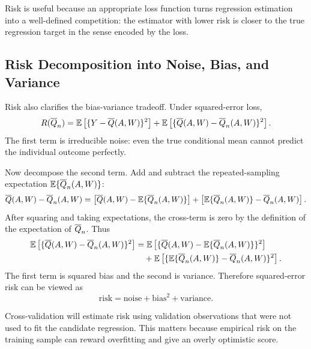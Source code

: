 \begin{keyidea}
Risk is useful because an appropriate loss function turns regression estimation into a
well-defined competition: the estimator with lower risk is closer to the true
regression target in the sense encoded by the loss.
\end{keyidea}

\subsection{Risk Decomposition into Noise, Bias, and Variance}

Risk also clarifies the bias-variance tradeoff. Under squared-error loss,
\[
R(\overline{Q}_n)
=
\mathbb{E}\left[
\{Y-\overline{Q}(A,W)\}^2
\right]
+
\mathbb{E}\left[
\{\overline{Q}(A,W)-\overline{Q}_n(A,W)\}^2
\right].
\]
The first term is irreducible noise: even the true conditional mean cannot predict the
individual outcome perfectly.

Now decompose the second term. Add and subtract the repeated-sampling expectation
$\mathbb{E}\{\overline{Q}_n(A,W)\}$:
\[
\overline{Q}(A,W)-\overline{Q}_n(A,W)
=
\left[\overline{Q}(A,W)-\mathbb{E}\{\overline{Q}_n(A,W)\}\right]
+
\left[\mathbb{E}\{\overline{Q}_n(A,W)\}-\overline{Q}_n(A,W)\right].
\]
After squaring and taking expectations, the cross-term is zero by the definition of the
expectation of $\overline{Q}_n$. Thus
\[
\begin{aligned}
\mathbb{E}\left[
\{\overline{Q}(A,W)-\overline{Q}_n(A,W)\}^2
\right]
&=
\mathbb{E}\left[
\{\overline{Q}(A,W)-\mathbb{E}\{\overline{Q}_n(A,W)\}\}^2
\right] \\
&\quad+
\mathbb{E}\left[
\{\mathbb{E}\{\overline{Q}_n(A,W)\}-\overline{Q}_n(A,W)\}^2
\right].
\end{aligned}
\]
The first term is squared bias and the second is variance. Therefore squared-error
risk can be viewed as
\[
\text{risk}
=
\text{noise}+\text{bias}^2+\text{variance}.
\]

\begin{estimationbox}
Cross-validation will estimate risk using validation observations that were not used
to fit the candidate regression. This matters because empirical risk on the training
sample can reward overfitting and give an overly optimistic score.
\end{estimationbox}
